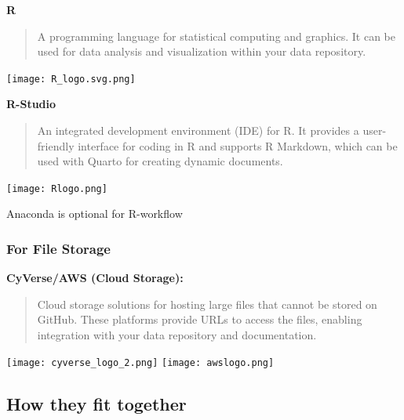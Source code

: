 \documentclass[
  letterpaper,
  DIV=11,
  numbers=noendperiod]{scrartcl}
\begin{document}
\textbf{R}

\begin{quote}
A programming language for statistical computing and graphics. It can be
used for data analysis and visualization within your data repository.
\end{quote}

\texttt{[image: R\_logo.svg.png]}

\textbf{R-Studio}

\begin{quote}
An integrated development environment (IDE) for R. It provides a
user-friendly interface for coding in R and supports R Markdown, which
can be used with Quarto for creating dynamic documents.
\end{quote}

\texttt{[image: Rlogo.png]}

\begin{tcolorbox}[enhanced jigsaw, arc=.35mm, bottomtitle=1mm, coltitle=black, opacitybacktitle=0.6, toprule=.15mm, bottomrule=.15mm, titlerule=0mm, leftrule=.75mm, rightrule=.15mm, title=\textcolor{quarto-callout-note-color}{\faInfo}\hspace{0.5em}{Note}, opacityback=0, colframe=quarto-callout-note-color-frame, breakable, toptitle=1mm, colback=white, colbacktitle=quarto-callout-note-color!10!white, left=2mm]

Anaconda is optional for R-workflow

\end{tcolorbox}

\subsubsection{For File Storage}\label{for-file-storage}

\textbf{CyVerse/AWS (Cloud Storage):}

\begin{quote}
Cloud storage solutions for hosting large files that cannot be stored on
GitHub. These platforms provide URLs to access the files, enabling
integration with your data repository and documentation.
\end{quote}

\texttt{[image: cyverse\_logo\_2.png]}
\texttt{[image: awslogo.png]}

\subsection{How they fit together}\label{how-they-fit-together}
\end{document}
